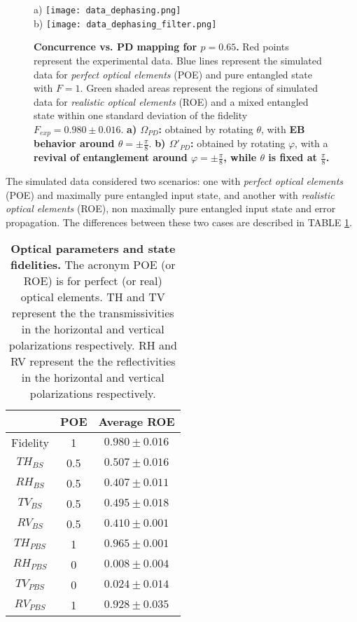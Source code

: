 \documentclass[aps,twocolumn,pra,superscriptaddress,showpacs,showkeys,floatfix]{revtex4-1}
\begin{document}
\begin{figure}[h!]
	\centering
	a)	\texttt{[image: data\_dephasing.png]}\\
	b)	\texttt{[image: data\_dephasing\_filter.png]}
	\caption{\textbf{Concurrence vs. PD mapping for $p=0.65$.} Red points represent the experimental data. Blue lines represent the simulated data for \textit{perfect optical elements} (POE) and pure entangled state with $F=1$. Green shaded areas represent the regions of simulated data for \textit{realistic optical elements} (ROE) and a mixed entangled state within one standard deviation of the fidelity $F_{exp}=0.980\pm0.016$. \textbf{a) $\Omega_{PD}$:} obtained by rotating $\theta$, with \textbf{EB behavior around $\theta=\pm\frac{\pi}{8}$}. \textbf{b) $\Omega'_{PD}$:} obtained by rotating $\varphi$, with a \textbf{revival of entanglement around $\varphi=\pm\frac{\pi}{8}$, while $\theta$ is fixed at $\frac{\pi}{8}$.}}
	\label{results_dephasing}
\end{figure}

The simulated data considered two scenarios: one with \textit{perfect optical elements} (POE) and maximally pure entangled input state, and another with \textit{realistic optical elements} (ROE), non maximally pure entangled input state and error propagation. The differences between these two cases are described in TABLE \ref{table}.

\begin{table}[h!]
\centering
		\begin{tabular}{|c|c|c|}
		\hline
			&POE & Average ROE\\
			\hline
			Fidelity&1&$0.980\pm0.016$\\
			\hline
			$TH_{BS}$&0.5&$0.507\pm0.016$\\
			$RH_{BS}$&0.5&$0.407\pm0.011$\\
			$TV_{BS}$&0.5&$0.495\pm0.018$\\
			$RV_{BS}$&0.5&$0.410\pm0.001$\\
			$TH_{PBS}$&1&$0.965\pm0.001$\\
			$RH_{PBS}$&0&$0.008\pm0.004$\\
			$TV_{PBS}$&0&$0.024\pm0.014$\\
			$RV_{PBS}$&1&$0.928\pm0.035$\\
			\hline
		\end{tabular}
		\caption{\textbf{Optical parameters and state fidelities.} The acronym POE (or ROE) is for perfect (or real) optical elements. TH and TV represent the the transmissivities in the horizontal and vertical polarizations respectively. RH and RV represent the the reflectivities in the horizontal and vertical polarizations respectively.}
		\label{table}
\end{table}
\end{document}
